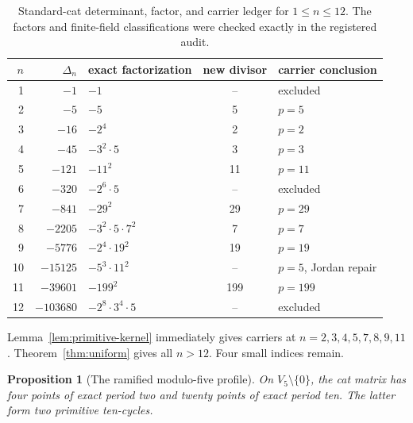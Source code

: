 \documentclass[11pt]{article}
\newtheorem{proposition}[theorem]{Proposition}
\theoremstyle{definition}
\theoremstyle{remark}
\begin{document}
\begin{table}[tbp]
\centering
\caption{Standard-cat determinant, factor, and carrier ledger for
\(1\le n\le12\).  The factors and finite-field classifications were checked
exactly in the registered audit.}
\label{tab:ledger}
\footnotesize
\begin{tabular}{@{}r r l c l@{}}
\toprule
\(n\) & \(\Delta_n\) & exact factorization & new divisor & carrier conclusion \\
\midrule
1  & \(-1\)      & \(-1\)                         & --    & excluded \\
2  & \(-5\)      & \(-5\)                         & 5     & \(p=5\) \\
3  & \(-16\)     & \(-2^4\)                       & 2     & \(p=2\) \\
4  & \(-45\)     & \(-3^2\cdot5\)                & 3     & \(p=3\) \\
5  & \(-121\)    & \(-11^2\)                      & 11    & \(p=11\) \\
6  & \(-320\)    & \(-2^6\cdot5\)                & --    & excluded \\
7  & \(-841\)    & \(-29^2\)                      & 29    & \(p=29\) \\
8  & \(-2205\)   & \(-3^2\cdot5\cdot7^2\)       & 7     & \(p=7\) \\
9  & \(-5776\)   & \(-2^4\cdot19^2\)             & 19    & \(p=19\) \\
10 & \(-15125\)  & \(-5^3\cdot11^2\)             & --    & \(p=5\), Jordan repair \\
11 & \(-39601\)  & \(-199^2\)                     & 199   & \(p=199\) \\
12 & \(-103680\) & \(-2^8\cdot3^4\cdot5\)       & --    & excluded \\
\bottomrule
\end{tabular}
\end{table}

Lemma~\ref{lem:primitive-kernel} immediately gives carriers at
\(n=2,3,4,5,7,8,9,11\).  Theorem~\ref{thm:uniform} gives all
\(n>12\).  Four small indices remain.

\begin{proposition}[The ramified modulo-five profile]
\label{prop:jordan}
On \(V_5\setminus\{0\}\), the cat matrix has four points of exact period
two and twenty points of exact period ten.  The latter form two primitive
ten-cycles.
\end{proposition}
\end{document}
